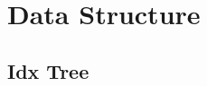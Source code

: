 \documentclass[10pt,landscape,a4paper,twocolumn]{article}
\begin{document}
%

%

%

%


\section{Data Structure}

\subsection{Idx Tree}

%

%

%

%
\end{document}
